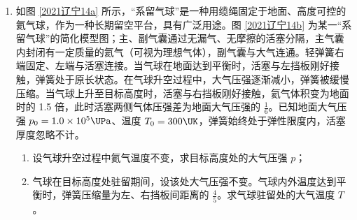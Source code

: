 \documentclass[\gkver]{gaokaozhenti}
\begin{document}
\begin{enumerate}
{$\mu mg\cos\alpha-mg\sin\alpha=ma$

解得

$a=0.4\Umsq$

（2）根据（1）可知小包裹开始阶段在传送带上做匀减速直线运动，用时

$t_1=\frac{v_2-v_1}{a}=\frac{1.6-0.6}{0.4}\Us=2.5\Us$

在传送带上滑动的距离为

$x_1=\frac{v_1+v_2}{2}t_1=\frac{1.6+0.6}{2}\times2.5\Um=2.75\Um$

因为小包裹所受滑动摩擦力大于重力沿传送带方向上的分力，即 $\mu mg\cos\alpha>mg\sin\alpha$，所以小包裹与传送带共速后做匀速直线运动至传送带底端，匀速运动的时间为

$t_2=\frac{L-x_1}{v_1}=\frac{3.95-2.75}{0.6}\Us=2\Us$

所以小包裹通过传送带的时间为

$t=t_1+t_2=4.5\Us$
}

\item
如图 \ref{2021辽宁14a} 所示，“系留气球”是一种用缆绳固定于地面、高度可控的氦气球，作为一种长期留空平台，具有广泛用途。图 \ref{2021辽宁14b} 为某一“系留气球”的简化模型图；主、副气囊通过无漏气、无摩擦的活塞分隔，主气囊内封闭有一定质量的氦气（可视为理想气体），副气囊与大气连通。轻弹簧右端固定、左端与活塞连接。当气球在地面达到平衡时，活塞与左挡板刚好接触，弹簧处于原长状态。在气球升空过程中，大气压强逐渐减小，弹簧被缓慢压缩。当气球上升至目标高度时，活塞与右挡板刚好接触，氦气体积变为地面时的 1.5 倍，此时活塞两侧气体压强差为地面大气压强的 $\frac{1}{6}$。已知地面大气压强 $p_0=1.0\times10^5\UPa$、温度 $T_0=300\UK$，弹簧始终处于弹性限度内，活塞厚度忽略不计。


\begin{enumerate}
	\item
	设气球升空过程中氦气温度不变，求目标高度处的大气压强 $p$；
	\item
	气球在目标高度处驻留期间，设该处大气压强不变。气球内外温度达到平衡时，弹簧压缩量为左、右挡板间距离的 $\frac{4}{5}$。求气球驻留处的大气温度 $T$。
\end{enumerate}

\end{enumerate}
\end{document}
